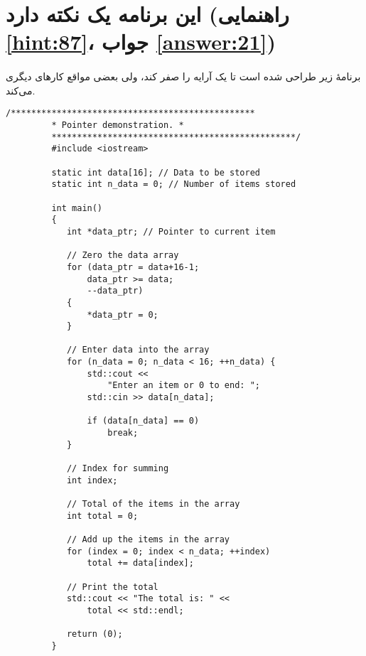 \section[این برنامه یک نکته دارد]{این برنامه یک نکته دارد \protect{} (راهنمایی \ref{hint:87}، جواب \ref{answer:21})}
\paragraph{}\label{prog:37}
برنامهٔ زیر طراحی شده است تا یک آرایه را صفر کند، ولی بعضی مواقع کارهای دیگری می‌کند.

\begin{LTR}
    \begin{lstlisting}[style=C++Style]
         /************************************************
         * Pointer demonstration. *
         ************************************************/
         #include <iostream>

         static int data[16]; // Data to be stored
         static int n_data = 0; // Number of items stored

         int main()
         {
         	int *data_ptr; // Pointer to current item

         	// Zero the data array
         	for (data_ptr = data+16-1;
         		data_ptr >= data;
         		--data_ptr)
        	{
         		*data_ptr = 0;
         	}

         	// Enter data into the array
         	for (n_data = 0; n_data < 16; ++n_data) {
         		std::cout <<
         			"Enter an item or 0 to end: ";
         		std::cin >> data[n_data];

         		if (data[n_data] == 0)
         			break;
         	}

         	// Index for summing
         	int index;

         	// Total of the items in the array
         	int total = 0;

         	// Add up the items in the array
         	for (index = 0; index < n_data; ++index)
         		total += data[index];

         	// Print the total
         	std::cout << "The total is: " <<
         		total << std::endl;

         	return (0);
         }
    \end{lstlisting}
\end{LTR}